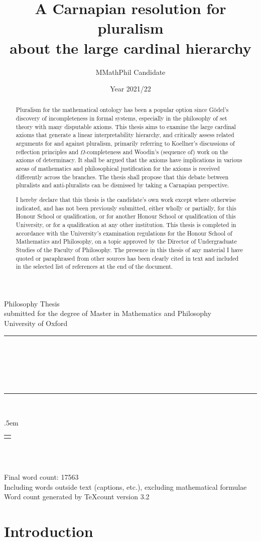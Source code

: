 \documentclass[12pt]{article}
\title{A Carnapian resolution for pluralism \\ about the large cardinal hierarchy}
\author{MMathPhil Candidate \censor*{7}}
\date{Year 2021/22}
\makeatletter
\renewcommand{\maketitle}{%
	\begin{titlepage}
		\vspace*{1.0cm}
		\begin{center}
			{\large \censor*{6} Philosophy Thesis}\\[.1cm]
			{submitted for the degree of Master in Mathematics and Philosophy}\\[.04cm]
			{University of Oxford}\\[.3cm]
			\rule{\textwidth}{1.5pt}\\[0cm]
			{\Large \bfseries \@title \par \ }\\[-.8cm]
			\rule{\textwidth}{1.5pt}\\[1.2cm]
			{\large
				\lineskip .5em%
				\begin{tabular}[t]{c}%
					\@author
				\end{tabular}
				\par \ }\\[-.3cm]
			{\large \@date}
			\vfill
			\vfill
			\vfill
			{\small Final word count: 17563}\\[.1cm]
			{\footnotesize Including words outside text (captions, etc.), excluding mathematical formulae}\\[.04cm]
			{\footnotesize Word count generated by TeXcount version 3.2}
			\vfill
		\end{center}
	\end{titlepage}
}
\theoremstyle{plain}
\theoremstyle{definition}
\makeatother
\begin{document}
\pagestyle{empty}
\raggedbottom

\maketitle

\begin{abstract}
	\noindent Pluralism for the mathematical ontology has been a popular option since G\"odel's discovery of incompleteness in formal systems, especially in the philosophy of set theory with many disputable axioms. This thesis aims to examine the large cardinal axioms that generate a linear interpretability hierarchy, and critically assess related arguments for and against pluralism, primarily referring to Koellner's discussions of reflection principles and $\Omega$-completeness and Woodin's (sequence of) work on the axioms of determinacy. It shall be argued that the axioms have implications in various areas of mathematics and philosophical justification for the axioms is received differently across the branches. The thesis shall propose that this debate between pluralists and anti-pluralists can be dismissed by taking a Carnapian perspective.
\end{abstract}

\vspace*{1.5cm}
\renewcommand{\abstractname}{Declaration of Authorship}
\begin{abstract}
	\noindent I hereby declare that this thesis is the candidate's own work except where otherwise indicated, and has not been previously submitted, either wholly or partially, for this Honour School or qualification, or for another Honour School or qualification of this University, or for a qualification at any other institution. This thesis is completed in accordance with the University's examination regulations for the Honour School of Mathematics and Philosophy, on a topic approved by the Director of Undergraduate Studies of the Faculty of Philosophy. The presence in this thesis of any material I have quoted or paraphrased from other sources has been clearly cited in text and included in the selected list of references at the end of the document.
\end{abstract}

\newpage
\tableofcontents
\newpage

\pagestyle{plain}
\flushbottom

\section{Introduction}
\end{document}
